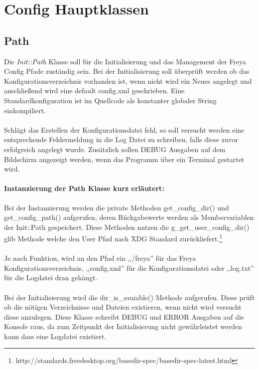 
\section{Config Hauptklassen}

\subsection{Path}
Die \emph{Init::Path} Klasse soll für die Initialisierung und das Management der Freya Config Pfade zuständig sein.
Bei der Initialisierung soll überprüft werden ob das Konfigurationsverzeichnis vorhanden ist, wenn nicht wird ein Neues
angelegt und anschließend wird eine default config.xml geschrieben. Eine Standardkonfiguration ist im Quellcode als 
konstanter globaler String einkompiliert.
\\
\\
Schlägt das Erstellen der Konfigurationsdatei fehl, so soll versucht werden eine entsprechende Fehlermeldung in die Log Datei zu schreiben, 
falls diese zuvor erfolgreich angelegt wurde. Zusätzlich sollen DEBUG Ausgaben auf dem Bildschirm angezeigt werden, wenn das Programm
über ein Terminal gestartet wird.

\paragraph{Instanzierung der Path Klasse kurz erläutert:}
Bei der Instanzierung werden die private Methoden get\_config\_dir() und get\_config\_path() aufgerufen, deren Rückgabewerte werden
als Membervariablen der Init::Path gespeichert. Diese Methoden nutzen die g\_get\_user\_config\_dir() glib Methode
welche den User Pfad nach XDG Standard zurückliefert.\footnote{http://standards.freedesktop.org/basedir-spec/basedir-spec-latest.html}
\\
\\
Je nach Funktion, wird an den Pfad ein ,,/freya'' für das Freya Konfigurationsverzeichnis, ,,config.xml''
für die Konfigurationsdatei oder ,,log.txt'' für die Logdatei dran gehängt.
\\
\\
Bei der Initialisierung wird die dir\_is\_avaiable()
Methode aufgerufen. Diese prüft ob die nötigen Verzeichnisse und Dateien existieren, wenn nicht wird versucht diese
anzulegen. Diese Klasse schreibt DEBUG und ERROR Ausgaben auf die Konsole raus, da zum Zeitpunkt der Initialisierung
nicht gewährleistet werden kann dass eine Logdatei existiert.


